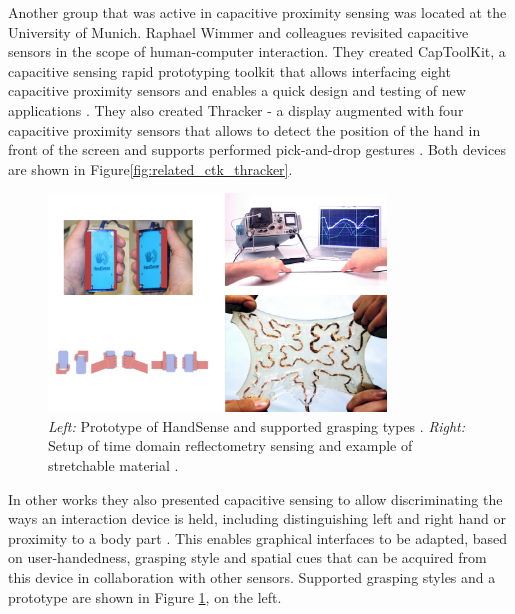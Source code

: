 Another group that was active in capacitive proximity sensing was located at the University of Munich. Raphael Wimmer and colleagues revisited capacitive sensors in the scope of human-computer interaction. They created CapToolKit, a capacitive sensing rapid prototyping toolkit that allows interfacing eight capacitive proximity sensors and enables a quick design and testing of new applications  \cite{Wimmer2007a}. They also created Thracker - a display augmented with four capacitive proximity sensors that allows to detect the position of the hand in front of the screen and supports performed pick-and-drop gestures \cite{Wimmer2006}. Both devices are shown in Figure\ref{fig:related_ctk_thracker}.
\begin{figure}[h]
\centering
\includegraphics[width=0.8\textwidth]{images/related_handsense_tdr}
\caption{\emph{Left:} Prototype of HandSense and supported grasping types \cite{wimmer2009handsense}. \emph{Right:} Setup of time domain reflectometry sensing and example of stretchable material \cite{wimmer2011modular}.}
\label{fig:related_handsense_tdr}
\end{figure}

In other works they also presented capacitive sensing to allow discriminating the ways an interaction device is held, including distinguishing left and right hand or proximity to a body part \cite{ wimmer2009handsense}. This enables graphical interfaces to be adapted, based on user-handedness, grasping style and spatial cues that can be acquired from this device in collaboration with other sensors. Supported grasping styles and a prototype are shown in Figure \ref{fig:related_handsense_tdr}, on the left.

